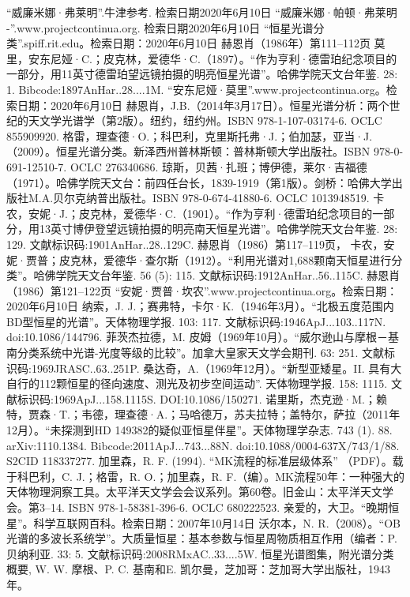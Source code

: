 \begin{enumerate}
 “威廉米娜·弗莱明”.牛津参考. 检索日期2020年6月10日
 “威廉米娜·帕顿·弗莱明 -”.www.projectcontinua.org. 检索日期2020年6月10日
 “恒星光谱分类”.spiff.rit.edu。检索日期：2020年6月10日
 赫恩肖（1986年）第111–112页
 莫里，安东尼娅·C.；皮克林，爱德华·C.（1897）。“作为亨利·德雷珀纪念项目的一部分，用11英寸德雷珀望远镜拍摄的明亮恒星光谱”。哈佛学院天文台年鉴. 28: 1. Bibcode:1897AnHar..28....1M.
 “安东尼娅·莫里”.www.projectcontinua.org。检索日期：2020年6月10日
赫恩肖，J.B.（2014年3月17日）。恒星光谱分析：两个世纪的天文学光谱学（第2版）。纽约，纽约州。ISBN 978-1-107-03174-6. OCLC 855909920.
格雷，理查德·O.；科巴利，克里斯托弗·J.；伯加瑟，亚当·J.（2009）。恒星光谱分类。新泽西州普林斯顿：普林斯顿大学出版社。ISBN 978-0-691-12510-7. OCLC 276340686.
 琼斯，贝茜·扎班；博伊德，莱尔·吉福德（1971）。哈佛学院天文台：前四任台长，1839-1919（第1版）。剑桥：哈佛大学出版社M.A.贝尔克纳普出版社。ISBN 978-0-674-41880-6. OCLC 1013948519.
 卡农，安妮·J.；皮克林，爱德华·C.（1901）。“作为亨利·德雷珀纪念项目的一部分，用13英寸博伊登望远镜拍摄的明亮南天恒星光谱”。哈佛学院天文台年鉴. 28: 129. 文献标识码:1901AnHar..28..129C.
 赫恩肖（1986）第117–119页，
 卡农，安妮·贾普；皮克林，爱德华·查尔斯（1912）。“利用光谱对1,688颗南天恒星进行分类”。哈佛学院天文台年鉴. 56 (5): 115. 文献标识码:1912AnHar..56..115C.
 赫恩肖（1986）第121–122页
 “安妮·贾普·坎农”.www.projectcontinua.org。检索日期：2020年6月10日
 纳索，J. J.；赛弗特，卡尔·K.（1946年3月）。“北极五度范围内BD型恒星的光谱”。天体物理学报. 103: 117. 文献标识码:1946ApJ...103..117N. doi:10.1086/144796.
 菲茨杰拉德，M. 皮姆（1969年10月）。“威尔逊山与摩根－基南分类系统中光谱-光度等级的比较”。加拿大皇家天文学会期刊. 63: 251. 文献标识码:1969JRASC..63..251P.
 桑达奇，A.（1969年12月）。“新型亚矮星。II. 具有大自行的112颗恒星的径向速度、测光及初步空间运动”. 天体物理学报. 158: 1115. 文献标识码:1969ApJ...158.1115S. DOI:10.1086/150271.
 诺里斯，杰克逊·M.；赖特，贾森·T.；韦德，理查德·A.；马哈德万，苏夫拉特；盖特尔，萨拉（2011年12月）。“未探测到HD 149382的疑似亚恒星伴星”。天体物理学杂志. 743 (1). 88. arXiv:1110.1384. Bibcode:2011ApJ...743...88N. doi:10.1088/0004-637X/743/1/88. S2CID 118337277.
 加里森，R. F. (1994). “MK流程的标准层级体系” （PDF）。载于科巴利，C. J.；格雷，R. O.；加里森，R. F.（编）。MK流程50年：一种强大的天体物理洞察工具。太平洋天文学会会议系列。第60卷。旧金山：太平洋天文学会。第3–14. ISBN 978-1-58381-396-6. OCLC 680222523.
 亲爱的，大卫。“晚期恒星”。科学互联网百科。检索日期：2007年10月14日
 沃尔本，N. R.（2008）。“OB光谱的多波长系统学”。大质量恒星：基本参数与恒星周物质相互作用（编者：P. 贝纳利亚. 33: 5. 文献标识码:2008RMxAC..33....5W.
 恒星光谱图集，附光谱分类概要, W. W. 摩根、P. C. 基南和E. 凯尔曼，芝加哥：芝加哥大学出版社，1943年。

\end{enumerate}
